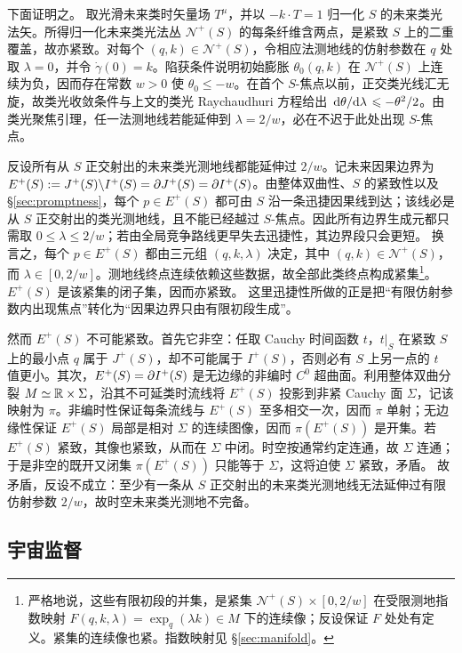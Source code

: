 下面证明之。
取光滑未来类时矢量场 $T^\mu$，并以 $-k\cdot T=1$ 归一化 $S$ 的未来类光法矢。所得归一化未来类光法丛 $\mathscr N^+(S)$ 的每条纤维含两点，是紧致 $S$ 上的二重覆盖，故亦紧致。对每个 $(q,k)\in\mathscr N^+(S)$，令相应法测地线的仿射参数在 $q$ 处取 $\lambda=0$，并令 $\dot\gamma(0)=k$。陷获条件说明初始膨胀 $\theta_0(q,k)$ 在 $\mathscr N^+(S)$ 上连续为负，因而存在常数 $w>0$ 使 $\theta_0\leqslant-w$。在首个 $S$-焦点以前，正交类光线汇无旋，故类光收敛条件与上文的类光 Raychaudhuri 方程给出 $\dv*{\theta}{\lambda}\leqslant-\theta^2/2$。由类光聚焦引理，任一法测地线若能延伸到 $\lambda=2/w$，必在不迟于此处出现 $S$-焦点。

反设所有从 $S$ 正交射出的未来类光测地线都能延伸过 $2/w$。记未来因果边界为 $E^+(S):=J^+(S)\backslash I^+(S)=\partial J^+(S)=\partial I^+(S)$。由整体双曲性、$S$ 的紧致性以及 \S\ref{sec:promptness}，每个 $p\in E^+(S)$ 都可由 $S$ 沿一条迅捷因果线到达；该线必是从 $S$ 正交射出的类光测地线，且不能已经越过 $S$-焦点。因此所有边界生成元都只需取 $0\leqslant\lambda\leqslant2/w$；若由全局竞争路线更早失去迅捷性，其边界段只会更短。
换言之，每个 $p\in E^+(S)$ 都由三元组 $(q,k,\lambda)$ 决定，其中 $(q,k)\in\mathscr N^+(S)$，而 $\lambda\in[0,2/w]$。测地线终点连续依赖这些数据，故全部此类终点构成紧集\footnote{严格地说，这些有限初段的并集，是紧集 $\mathscr N^+(S)\times[0,2/w]$ 在受限测地指数映射 $F(q,k,\lambda)=\exp_q(\lambda k)\in M$ 下的连续像；反设保证 $F$ 处处有定义。紧集的连续像也紧。指数映射见 \S\ref{sec:manifold}。}。$E^+(S)$ 是该紧集的闭子集，因而亦紧致。
这里迅捷性所做的正是把“有限仿射参数内出现焦点”转化为“因果边界只由有限初段生成”。

然而 $E^+(S)$ 不可能紧致。首先它非空：任取 Cauchy 时间函数 $t$，$t|_S$ 在紧致 $S$ 上的最小点 $q$ 属于 $J^+(S)$，却不可能属于 $I^+(S)$，否则必有 $S$ 上另一点的 $t$ 值更小。其次，$E^+(S)=\partial I^+(S)$ 是无边缘的非编时 $C^0$ 超曲面。利用整体双曲分裂 $M\simeq\mathbb{R}\times\Sigma$，沿其不可延类时流线将 $E^+(S)$ 投影到非紧 Cauchy 面 $\Sigma$，记该映射为 $\pi$。非编时性保证每条流线与 $E^+(S)$ 至多相交一次，因而 $\pi$ 单射；无边缘性保证 $E^+(S)$ 局部是相对 $\Sigma$ 的连续图像，因而 $\pi(E^+(S))$ 是开集。若 $E^+(S)$ 紧致，其像也紧致，从而在 $\Sigma$ 中闭。时空按通常约定连通，故 $\Sigma$ 连通；于是非空的既开又闭集 $\pi(E^+(S))$ 只能等于 $\Sigma$，这将迫使 $\Sigma$ 紧致，矛盾。
故矛盾，反设不成立：至少有一条从 $S$ 正交射出的未来类光测地线无法延伸过有限仿射参数 $2/w$，故时空未来类光测地不完备。

\subsection{宇宙监督}\label{sec:cosmic-censorship}

